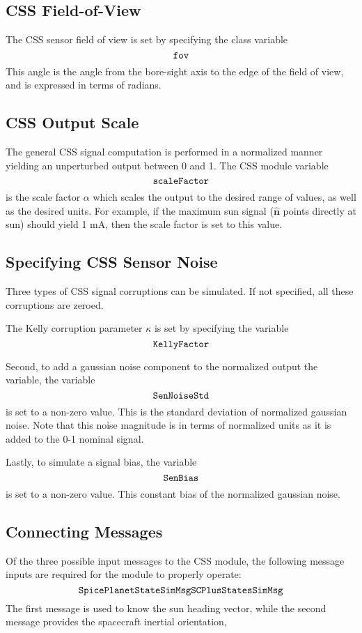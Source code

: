\subsection{CSS Field-of-View}
The CSS sensor field of view is set by specifying the class variable
$$
	{\tt fov}
$$
This angle is the angle from the bore-sight axis to the edge of the field of view, and is expressed in terms of radians.  





\subsection{CSS Output Scale}
The general CSS signal computation is performed in a normalized manner yielding an unperturbed output between 0 and 1.  The CSS module variable
$$
	{\tt scaleFactor}
$$
is the scale factor $\alpha$ which scales the output to the desired range of values, as well as the desired units.  For example, if the maximum sun signal ($\hat{\bm n}$ points directly at sun) should yield 1 mA, then the scale factor is set to this value.    



\subsection{Specifying CSS Sensor Noise}
Three types of CSS signal corruptions can be simulated.  If not specified, all these corruptions are zeroed.  

The Kelly corruption parameter $\kappa$ is set by specifying the variable
$$
	{\tt KellyFactor}
$$

Second, to add a gaussian noise component to the normalized output the variable, the variable
$$
	{\tt SenNoiseStd}
$$
is set to a non-zero value.  This is the standard deviation of normalized gaussian noise.  Note that this noise magnitude is in terms of normalized units as it is added to the 0-1 nominal signal.  

Lastly, to simulate a signal bias, the variable
$$
	{\tt SenBias}
$$
is set to a non-zero value.   This constant bias of the normalized gaussian noise.  


\subsection{Connecting Messages}
Of the three possible input messages to the CSS module, the following message inputs are required for the module to properly operate:
$$
	{\tt SpicePlanetStateSimMsg} \\
	{\tt SCPlusStatesSimMsg}
$$
The first message is used to know the sun heading vector, while the second message provides the spacecraft inertial orientation,

